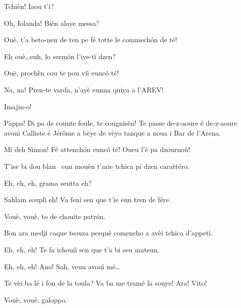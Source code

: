 \begin{drama}
\Iolandaspeaks {} Tchièn! Iaou t'i?


\Cienspeaks {} Oh, Iolanda! Bièn alaye messa?

\Iolandaspeaks Ouè, t’a beto-nen de ten pe fé totte le commech\'on de té!

\Cienspeaks Eh ouè\ldots euh, lo serm\'on l'iye-tì dzen?

\Iolandaspeaks  Ouè, prochèn cou te pou viì eunc\'o té!

\Cienspeaks Na, na! Pren-te varda, n’ayè eunna quiya a l’AREV!

\Iolandaspeaks Imajin-o!

\Simonspeaks Pappa! Di pa de counte foule, te cougnisèn! Te passe de-z-aoure é de-z-aoure avouì Calliste é Jérôme a bèye de vèyo tanque a noua i Bar de l’Arena.

\Cienspeaks Mi deh Simon! Fé attench\'on eunc\'o té! Oueu l’è pa dzournoù!

\Iolandaspeaks T’ise bi dou blan \vino\ eun mouèn t’arie tchica pi dzen carattéro.

\Sahlammspeaks {}  Eh, eh, eh, grama seutta eh?

\Cienspeaks Sahlam souplì eh! Va fenì sen que t’ie eun tren de fére.

\Sahlammspeaks Vouè, vouè, to de chouite patr\'on.


\Cienspeaks {} Bon ara medjì caque tsouza perqué comencho a avèi tchica d’appetì.

\Sahlammspeaks {} Eh, eh, eh! Te fa ichouiì sen que t’a bi seu mateun. 


\Cienspeaks {} Eh, eh, eh! Ano! Sah, veun avouì mé\ldots


\Cienspeaks {} Te vèi ba lé i fon de la toula? Va ba me tramé la souye! Ara! Vito! 

\Sahlammspeaks Vouè, vouè, galoppo\galoppe.


\end{drama}

